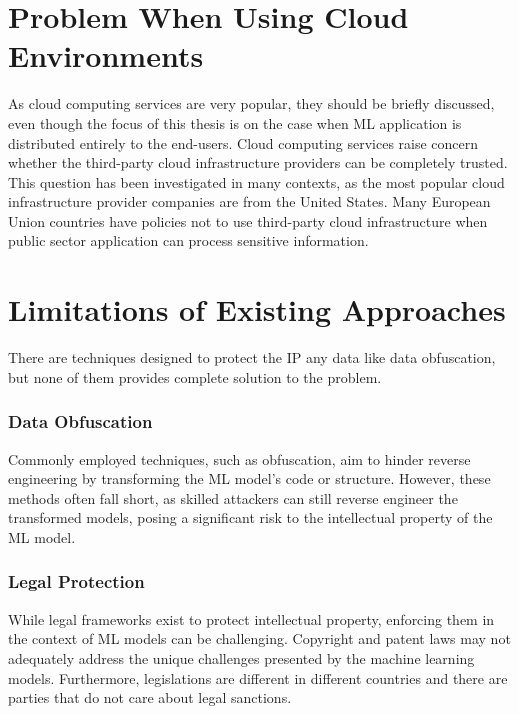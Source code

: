 \section{Problem When Using Cloud Environments} \label{problem-cloud}

As cloud computing services are very popular, they should be briefly discussed, even though the focus of this thesis is on the case when ML application is distributed entirely to the end-users. Cloud computing services raise concern whether the third-party cloud infrastructure providers can be completely trusted. This question has been investigated in many contexts, as the most popular cloud infrastructure provider companies are from the United States. Many European Union countries have policies not to use third-party cloud infrastructure when public sector application can process sensitive information.

\section{Limitations of Existing Approaches} \label{limit}

There are techniques designed to protect the IP any data like data obfuscation, but none of them provides complete solution to the problem.

\subsubsection{Data Obfuscation} \label{obfuscation}

Commonly employed techniques, such as obfuscation, aim to hinder reverse engineering by transforming the ML model's code or structure. However, these methods often fall short, as skilled attackers can still reverse engineer the transformed models, posing a significant risk to the intellectual property of the ML model.\cite{obfuscation}

\subsubsection{Legal Protection} \label{legal}

While legal frameworks exist to protect intellectual property, enforcing them in the context of ML models can be challenging. Copyright and patent laws may not adequately address the unique challenges presented by the machine learning models. Furthermore, legislations are different in different countries and there are parties that do not care about legal sanctions.
